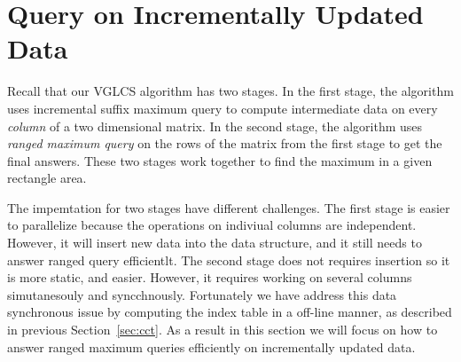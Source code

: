 \section{Query on Incrementally Updated Data}
\label{sec:parallelIRMQ}

Recall that our VGLCS algorithm has two stages.  In the first stage,
the algorithm uses incremental suffix maximum query to compute
intermediate data on every {\em column} of a two dimensional matrix.
In the second stage, the algorithm uses {\em ranged maximum query} on
the rows of the matrix from the first stage to get the final answers.
These two stages work together to find the maximum in a given
rectangle area.

The impemtation for two stages have different challenges.  The first
stage is easier to parallelize because the operations on indiviual
columns are independent.  However, it will insert new data into the
data structure, and it still needs to answer ranged query efficientlt.
The second stage does not requires insertion so it is more static, and
easier.  However, it requires working on several columns simutanesouly
and syncchnously.  Fortunately we have address this data synchronous
issue by computing the index table in a off-line manner, as described
in previous Section~\ref{sec:cct}.  As a result in this section we
will focus on how to answer ranged maximum queries efficiently on
incrementally updated data.



\iffalse VGLCS 問題主要分成縱向和橫向兩階段，縱向處理每一列的區間極值
查找，橫向處理每一行的區間極值查找，兩者合併構成區域極值查找。在縱向方
面為數個獨立的數據結構，這部分易於平行；相反地，在橫向方面，需要共同協
作一個數據結構。綜觀這兩者的差異，縱向需要動態的後綴插入和區間查詢，而
橫向可以離線完成區間查找。在上一節中，我們提出在橫向處理的實作，若限制
上述的實作方案在單一處理器上，時間複雜度的瓶頸在於縱向的動態更新與查找。
在這個章節中，我們提出支持動態插入和區間查找的數據結構，最後的成果如表
\ref{tlb:cmp-complexity}。
\fi


